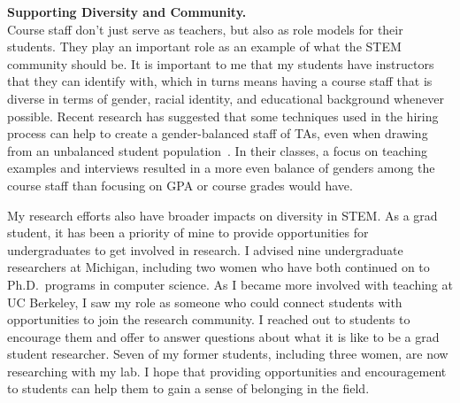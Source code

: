 \documentclass[11pt]{article} %
\begin{document}
\smallskip
\textbf{\textsf{\large Supporting Diversity and Community.}}\\
Course staff don't just serve as teachers, but also as role models for their
students. They play an important role as an example of what the STEM community
should be.
%
It is important to me that my students have instructors that they can identify
with, which in turns means having a course staff that is diverse in terms of
gender, racial identity, and educational background whenever possible.
%
Recent research has suggested that some techniques used in the hiring process
can help to create a gender-balanced staff of TAs, even when drawing from an
unbalanced student population~\footnotemark{}. In their classes, a focus on
teaching examples and interviews resulted in a more even balance of genders
among the course staff than focusing on GPA or course grades would have.


My research efforts also have broader impacts on diversity in STEM.
%
As a grad student, it has been a priority of mine to provide opportunities for
undergraduates to get involved in research. I advised nine undergraduate
researchers at Michigan, including two women who have both continued on to
Ph.D.\ programs in computer science.
%
As I became more involved with teaching at UC Berkeley, I saw my role as
someone who could connect students with opportunities to join the research
community.
I reached out
to students to encourage them and offer to answer questions about what it is
like to be a grad student researcher. Seven of my former students, including
three women, are now researching with my lab.
%
I hope that providing opportunities and encouragement to students can help them
to gain a sense of belonging in the field.

%
\end{document}
